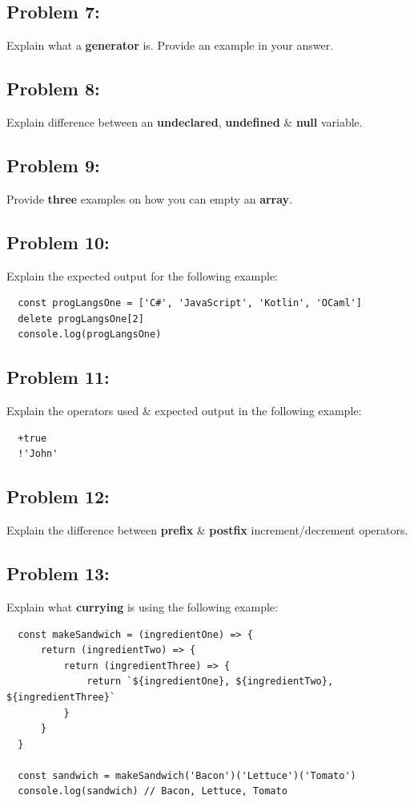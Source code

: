 \documentclass{article}
\begin{document}
\subsection*{Problem 7:}
Explain what a \textbf{generator} is. Provide an example in your answer.

\subsection*{Problem 8:}
Explain difference between an \textbf{undeclared}, \textbf{undefined} \& \textbf{null} variable.

\subsection*{Problem 9:}
Provide \textbf{three} examples on how you can empty an \textbf{array}.

\subsection*{Problem 10:}
Explain the expected output for the following example:

\begin{verbatim}
  const progLangsOne = ['C#', 'JavaScript', 'Kotlin', 'OCaml']
  delete progLangsOne[2]
  console.log(progLangsOne)
\end{verbatim}

\subsection*{Problem 11:}
Explain the operators used \& expected output in the following example:

\begin{verbatim}
  +true
  !'John'
\end{verbatim}

\subsection*{Problem 12:}
Explain the difference between \textbf{prefix} \& \textbf{postfix} increment/decrement operators.

\subsection*{Problem 13:}
Explain what \textbf{currying} is using the following example:

\begin{verbatim}
  const makeSandwich = (ingredientOne) => {
      return (ingredientTwo) => {
          return (ingredientThree) => {
              return `${ingredientOne}, ${ingredientTwo}, ${ingredientThree}`
          }
      }
  }

  const sandwich = makeSandwich('Bacon')('Lettuce')('Tomato')
  console.log(sandwich) // Bacon, Lettuce, Tomato
\end{verbatim}
\end{document}

